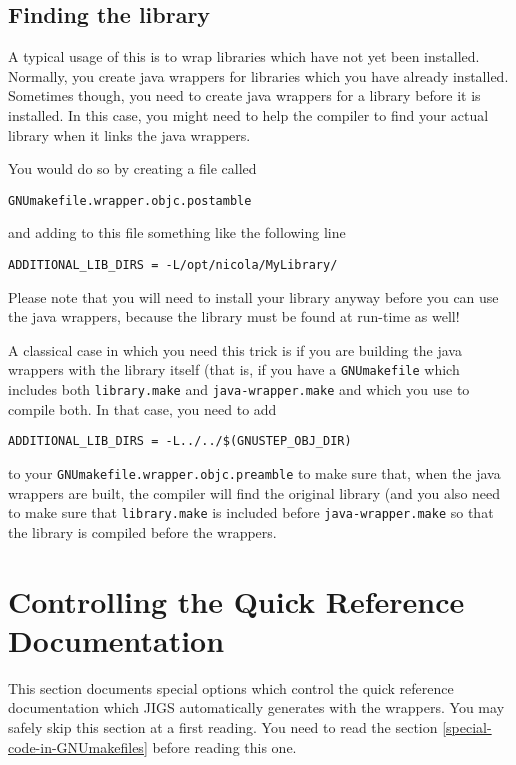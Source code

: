 \subsection{Finding the library}
A typical usage of this is to wrap libraries which have not yet been
installed.  Normally, you create java wrappers for libraries which you
have already installed.  Sometimes though, you need to create java
wrappers for a library before it is installed.  In this case, you
might need to help the compiler to find your actual library when it
links the java wrappers.

You would do so by creating a file called
\begin{verbatim}
GNUmakefile.wrapper.objc.postamble
\end{verbatim}
and adding to this file something like the following line
\begin{verbatim}
ADDITIONAL_LIB_DIRS = -L/opt/nicola/MyLibrary/
\end{verbatim}
Please note that you will need to install your library anyway before
you can use the java wrappers, because the library must be found at
run-time as well!

A classical case in which you need this trick is if you are building
the java wrappers with the library itself (that is, if you have a
\texttt{GNUmakefile} which includes both \texttt{library.make} and
\texttt{java-wrapper.make} and which you use to compile both.  In that
case, you need to add
\begin{verbatim}
ADDITIONAL_LIB_DIRS = -L../../$(GNUSTEP_OBJ_DIR)
\end{verbatim}
to your \texttt{GNUmakefile.wrapper.objc.preamble} to make sure that,
when the java wrappers are built, the compiler will find the original
library (and you also need to make sure that \texttt{library.make} is
included before \texttt{java-wrapper.make} so that the library is
compiled before the wrappers.

\section{Controlling the Quick Reference Documentation}

This section documents special options which control the quick
reference documentation which JIGS automatically generates with the
wrappers.  You may safely skip this section at a first reading.  You
need to read the section \ref{special-code-in-GNUmakefiles} before
reading this one.

